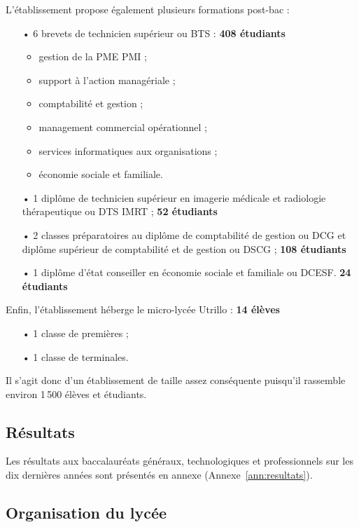 \documentclass[12pt,a4paper]{article}
\begin{document}
L'établissement propose également plusieurs formations post-bac :
\begin{itemize}
\item[•] 6 brevets de technicien supérieur ou BTS : \hfill \textbf{408 étudiants}
\begin{itemize}
\item gestion de la PME PMI ;
\item support à l'action managériale ;
\item comptabilité et gestion ;
\item management commercial opérationnel ;
\item services informatiques aux organisations ;
\item économie sociale et familiale.
\end{itemize}
\item[•] 1 diplôme de technicien supérieur en imagerie médicale et radiologie thérapeutique ou DTS IMRT ; \hfill \textbf{52 étudiants}
\item[•] 2 classes préparatoires au diplôme de comptabilité de gestion ou DCG et diplôme supérieur de comptabilité et de gestion ou DSCG ; \hfill \textbf{108 étudiants}
\item[•] 1 diplôme d'état conseiller en économie sociale et familiale ou DCESF. \hfill \textbf{24 étudiants}
\end{itemize}

Enfin, l'établissement héberge le micro-lycée Utrillo : \hfill \textbf{14 élèves}
\begin{itemize}
\item[•] 1 classe de premières ;
\item[•] 1 classe de terminales.
\end{itemize}

Il s'agit donc d'un établissement de taille assez conséquente puisqu'il rassemble environ 1\,500 élèves et étudiants.

\subsection{Résultats}

Les résultats aux baccalauréats généraux, technologiques et professionnels sur les dix dernières années sont présentés en annexe (Annexe~\ref{ann:resultats}).

\subsection{Organisation du lycée}
\end{document}
